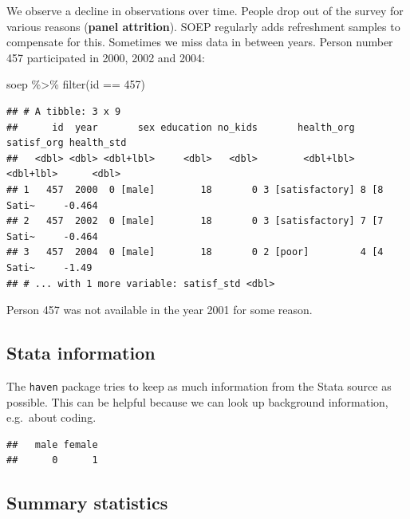 \documentclass[
]{book}
\newenvironment{Shaded}{\begin{snugshade}}{\end{snugshade}}
\newcommand{\DecValTok}[1]{\textcolor[rgb]{0.00,0.00,0.81}{#1}}
\newcommand{\FunctionTok}[1]{\textcolor[rgb]{0.00,0.00,0.00}{#1}}
\newcommand{\NormalTok}[1]{#1}
\newcommand{\SpecialCharTok}[1]{\textcolor[rgb]{0.00,0.00,0.00}{#1}}
\newcommand{\StringTok}[1]{\textcolor[rgb]{0.31,0.60,0.02}{#1}}
\begin{document}
We observe a decline in observations over time. People drop out of the survey for various reasons (\textbf{panel attrition}). SOEP regularly adds refreshment samples to compensate for this. Sometimes we miss data in between years. Person number 457 participated in 2000, 2002 and 2004:

\begin{Shaded}
\begin{Highlighting}[]
\NormalTok{soep }\SpecialCharTok{\%\textgreater{}\%}
  \FunctionTok{filter}\NormalTok{(id }\SpecialCharTok{==} \DecValTok{457}\NormalTok{)}
\end{Highlighting}
\end{Shaded}

\begin{verbatim}
## # A tibble: 3 x 9
##      id  year       sex education no_kids       health_org satisf_org health_std
##   <dbl> <dbl> <dbl+lbl>     <dbl>   <dbl>        <dbl+lbl>  <dbl+lbl>      <dbl>
## 1   457  2000  0 [male]        18       0 3 [satisfactory] 8 [8 Sati~     -0.464
## 2   457  2002  0 [male]        18       0 3 [satisfactory] 7 [7 Sati~     -0.464
## 3   457  2004  0 [male]        18       0 2 [poor]         4 [4 Sati~     -1.49 
## # ... with 1 more variable: satisf_std <dbl>
\end{verbatim}

Person 457 was not available in the year 2001 for some reason.

\hypertarget{stata-information}{%
\subsection{Stata information}\label{stata-information}}

The \texttt{haven} package tries to keep as much information from the Stata source as possible. This can be helpful because we can look up background information, e.g.~about coding.

\begin{Shaded}
\end{Shaded}

\begin{verbatim}
##   male female 
##      0      1
\end{verbatim}

\hypertarget{summary-statistics}{%
\subsection{Summary statistics}\label{summary-statistics}}
\end{document}
